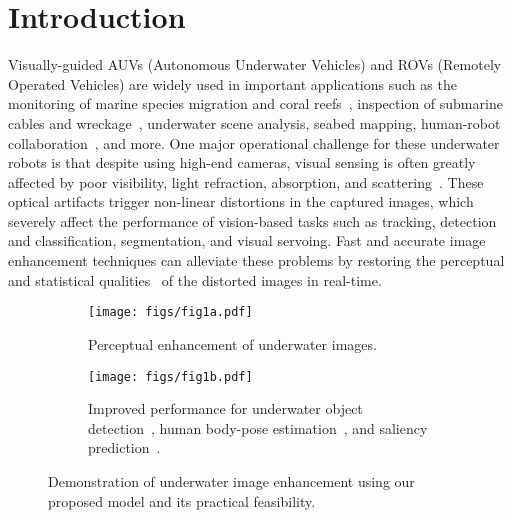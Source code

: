 \documentclass[10pt,twocolumn,letterpaper]{article}
\begin{document}
 \section{Introduction}
Visually-guided AUVs (Autonomous Underwater Vehicles) and ROVs (Remotely Operated Vehicles) are widely used in important applications such as the monitoring of marine species migration and coral reefs~\cite{shkurti2012multi}, inspection of submarine cables and wreckage~\cite{bingham2010robotic}, underwater scene analysis, seabed mapping, human-robot collaboration~\cite{islam2018understanding}, and more. One major operational challenge for these underwater robots is that despite using high-end cameras, visual sensing is often greatly affected by poor visibility, light refraction, absorption, and scattering~\cite{lu2013underwater,zhang2017underwater,islam2018understanding}. These optical artifacts trigger non-linear distortions in the captured images, which severely affect the performance of vision-based tasks such as tracking, detection and classification, segmentation, and visual servoing. Fast and accurate image enhancement techniques can alleviate these problems by restoring the perceptual and statistical qualities~\cite{fabbri2018enhancing,zhang2017underwater} of the distorted images in real-time.           

\begin{figure}[t]
    \centering
    \begin{subfigure}{0.48\textwidth}
        \texttt{[image: figs/fig1a.pdf]}\vspace{-1mm}
        \caption{Perceptual enhancement of underwater images.}\end{subfigure}
    
    \vspace{1mm}
    \begin{subfigure}{0.48\textwidth}
        \texttt{[image: figs/fig1b.pdf]}\vspace{-1mm}
        \caption{Improved performance for underwater object detection~\cite{islam2018towards}, human body-pose estimation~\cite{cao2017realtime}, and saliency prediction~\cite{wang2018salient}.}
    \end{subfigure}
    
    \caption{Demonstration of underwater image enhancement using our proposed model and its practical feasibility.}
    \label{fig:1}
\end{figure}
    
\end{document}
